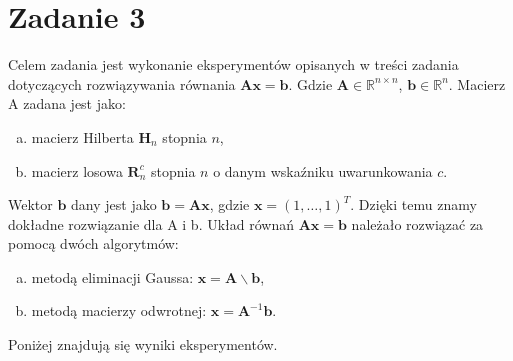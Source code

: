 \documentclass[]{article}
\begin{document}
	\clearpage

	\section*{Zadanie 3} 
	
	Celem zadania jest wykonanie eksperymentów opisanych w treści zadania dotyczących rozwiązywania równania $\mathbf{Ax = b}$. Gdzie $\mathbf{A} \in \mathbb{R}^{n\times n}$,  $\mathbf{b} \in \mathbb{R}^n$.
	Macierz A zadana jest jako:
	\begin{enumerate}[a)]
		\item macierz Hilberta $\mathbf{H}_n$ stopnia $n$,
		\item macierz losowa $\mathbf{R}_n^c$ stopnia $n$ o danym wskaźniku uwarunkowania $c$.
	\end{enumerate}
	Wektor $\mathbf{b}$ dany jest jako $\mathbf{b = Ax}$, gdzie $\mathbf{x} = (1, \dots, 1)^{T}$. Dzięki temu znamy dokładne rozwiązanie dla A i b. Układ równań $\mathbf{Ax} = \mathbf{b}$ należało rozwiązać za pomocą dwóch algorytmów:
	\begin{enumerate}[a)]
		\item metodą eliminacji Gaussa: $\mathbf{x} = \mathbf{A} \backslash \mathbf{b}$,
		\item metodą macierzy odwrotnej: $\mathbf{x} = \mathbf{A}^{-1}\mathbf{b}$.
	\end{enumerate}
	Poniżej znajdują się wyniki eksperymentów.
	
\end{document}
